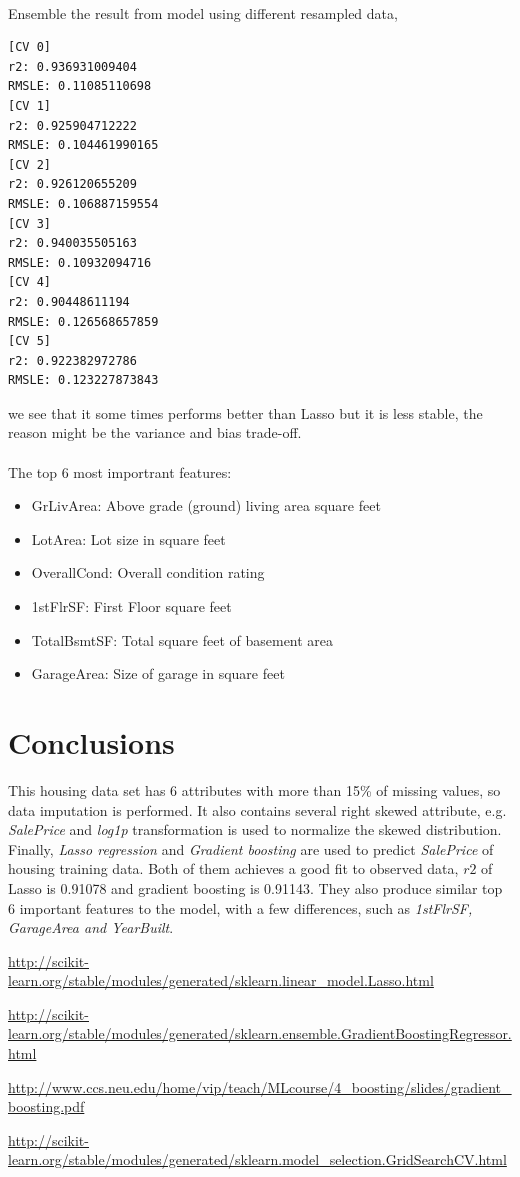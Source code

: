 \documentclass[12pt]{article}
\begin{document}
\\ Ensemble the result from model using different resampled data,
\begin{verbatim}
[CV 0]
r2: 0.936931009404
RMSLE: 0.11085110698
[CV 1]
r2: 0.925904712222
RMSLE: 0.104461990165
[CV 2]
r2: 0.926120655209
RMSLE: 0.106887159554
[CV 3]
r2: 0.940035505163
RMSLE: 0.10932094716
[CV 4]
r2: 0.90448611194
RMSLE: 0.126568657859
[CV 5]
r2: 0.922382972786
RMSLE: 0.123227873843
\end{verbatim}
we see that it some times performs better than Lasso but it is less stable, the reason might be the variance and bias trade-off.\\
\\
The top 6 most importrant features:
\begin{itemize}
\item GrLivArea: Above grade (ground) living area square feet
\item LotArea: Lot size in square feet
\item OverallCond: Overall condition rating
\item 1stFlrSF: First Floor square feet
\item TotalBsmtSF: Total square feet of basement area
\item GarageArea: Size of garage in square feet
\end{itemize}

\section{Conclusions}
This housing data set has 6 attributes with more than 15\% of missing values, so data imputation is performed. It also contains several right skewed attribute, e.g. \textit{SalePrice} and \textit{log1p} transformation is used to normalize the skewed distribution. Finally, \textit{Lasso regression} and \textit{Gradient boosting} are used to predict \textit{SalePrice} of housing training data. Both of them achieves a good fit to observed data, $r2$ of Lasso is 0.91078 and gradient boosting is 0.91143. They also produce similar top 6 important features to the model, with a few differences, such as \textit{1stFlrSF, GarageArea and YearBuilt}.

\begin{thebibliography}{9}
\url{http://scikit-learn.org/stable/modules/generated/sklearn.linear_model.Lasso.html}
	
\url{http://scikit-learn.org/stable/modules/generated/sklearn.ensemble.GradientBoostingRegressor.html}
	
\url{http://www.ccs.neu.edu/home/vip/teach/MLcourse/4_boosting/slides/gradient_boosting.pdf}

\url{http://scikit-learn.org/stable/modules/generated/sklearn.model_selection.GridSearchCV.html}
\end{thebibliography}
\end{document}
